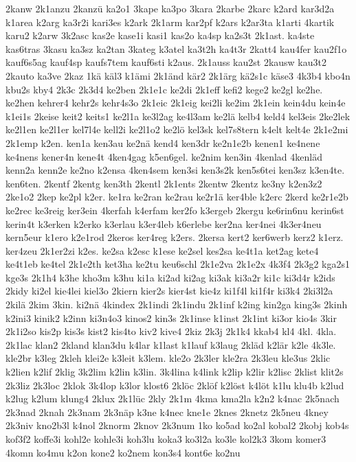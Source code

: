 {2kanw
2k1anzu
2kanzü
ka2o1
3kape
ka3po
3kara
2karbe
2karc
k2ard
kar3d2a
k1area
k2arg
ka3r2i
kari3es
k2ark
2k1arm
kar2pf
k2ars
k2ar3ta
k1arti
4kartik
karu2
k2arw
3k2asc
kas2e
kase1i
kasi1
kas2o
ka4sp
ka2s3t
2k1ast.
ka4ste
kas6tras
3kasu
ka3sz
ka2tan
3kateg
k3atel
ka3t2h
ka4t3r
2katt4
kau4fer
kau2f1o
kauf6s5ag
kauf4sp
kaufs7tem
kauf6sti
k2aus.
2k1auss
kau2st
2kausw
kau3t2
2kauto
ka3ve
2kaz
1kä
käl3
k1ämi
2k1änd
kär2
2k1ärg
kä2s1c
käse3
4k3b4
kbo4n
kbu2s
kby4
2k3c
2k3d4
ke2ben
2k1e1c
ke2di
2k1eff
kefi2
kege2
ke2gl
ke2he.
ke2hen
kehrer4
kehr2s
kehr4s3o
2k1eic
2k1eig
kei2li
ke2im
2k1ein
kein4du
kein4e
k1ei1s
2keise
keit2
keits1
ke2l1a
ke3l2ag
ke4l3am
ke2lä
kelb4
keld4
kel3eis
2ke2lek
ke2l1en
ke2l1er
kel7l4e
kell2i
ke2l1o2
ke2lö
kel3sk
kel7s8tern
k4elt
kelt4e
2k1e2mi
2k1emp
k2en.
ken1a
ken3au
ke2nä
kend4
ken3dr
ke2n1e2b
kenen1
ke4nene
ke4nens
kener4n
kene4t
4ken4gag
k5en6gel.
ke2nim
ken3in
4kenlad
4kenläd
kenn2a
kenn2e
ke2no
k2ensa
4ken4sem
ken3si
ken3s2k
ken5s6tei
ken3sz
k3en4te.
ken6ten.
2kentf
2kentg
ken3th
2kentl
2k1ents
2kentw
2kentz
ke3ny
k2en3z2
2ke1o2
2kep
ke2pl
k2er.
ke1ra
ke2ran
ke2rau
ke2r1ä
ker4ble
k2erc
2kerd
ke2r1e2b
ke2rec
ke3reig
ker3ein
4kerfah
k4erfam
ker2fo
k3ergeb
2kergu
ke6rin6nu
kerin6st
kerin4t
k3erken
k2erko
k3erlau
k3er4leb
k6erlebe
ker2na
ker4nei
4k3er4neu
kern5eur
k1ero
k2e1rod
2keros
ker4reg
k2ers.
2kersa
kert2
ker6werb
kerz2
k1erz.
ker4zeu
2k1er2zi
k2es.
ke2sa
k2esc
k1ese
ke2sel
kes2sa
ke4t1a
ket2ag
kete4
ke4t1eb
ke4tel
2k1e2th
ket3ha
ke2tu
keu6schl
2k1e2va
2k1e2x
4k3f4
2k3g2
kga2s1
kge3s
2k1h4
k3he
kho3m
k3hu
ki1a
ki2ad
ki2ag
ki3ak
ki3a2r
ki1c
ki3d4r
k2ids
2kidy
ki2el
kie4lei
kiel3o
2kiern
kier2s
kier4st
kie4z
ki1f4l
ki1f4r
ki3k4
2ki3l2a
2kilä
2kim
3kin.
ki2nä
4kindex
2k1indi
2k1indu
2k1inf
k2ing
kin2ga
king3s
2kinh
k2ini3
kinik2
k2inn
ki3n4o3
kinos2
kin3s
2k1inse
k1inst
2k1int
ki3or
kio4s
3kir
2k1i2so
kis2p
kis3s
kist2
kis4to
kiv2
kive4
2kiz
2k3j
2k1k4
kkab4
kl4
4kl.
4kla.
2k1lac
klan2
2kland
klan3du
k4lar
k1last
k1lauf
k3laug
2kläd
k2lär
k2le
4k3le.
kle2br
k3leg
2kleh
klei2e
k3leit
k3lem.
kle2o
2k3ler
kle2ra
2k3leu
kle3us
2klic
k2lien
k2lif
2klig
3k2lim
k2lin
k3lin.
3k4lina
k4link
k2lip
k2lir
k2lisc
2klist
klit2s
2k3liz
2k3loc
2klok
3k4lop
k3lor
klost6
2klöc
2klöf
k2löst
k4löt
k1lu
klu4b
k2lud
k2lug
k2lum
klung4
2klux
2k1lüc
2kly
2k1m
4kma
kma2la
k2n2
k4nac
2k5nach
2k3nad
2knah
2k3nam
2k3näp
k3ne
k4nec
kne1e
2knes
2knetz
2k5neu
4kney
2k3niv
kno2b3l
k4nol
2knorm
2knov
2k3num
1ko
ko5ad
ko2al
kobal2
2kobj
kob4s
kof3f2
koffe3i
kohl2e
kohle3i
koh3lu
koka3
ko3l2a
ko3le
kol2k3
3kom
komer3
4komn
ko4mu
k2on
kone2
ko2nem
kon3s4
kont6e
ko2nu
}
